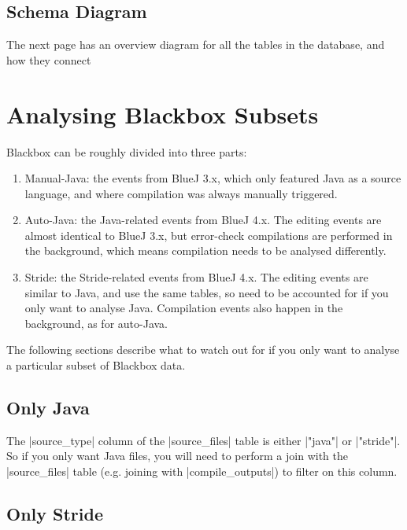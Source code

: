 \documentclass{report}
\begin{document}
\section{Schema Diagram}

The next page has an overview diagram for all the tables in the database, and
how they connect

\newpage



\chapter{Analysing Blackbox Subsets}
\label{sec:java-stride}

Blackbox can be roughly divided into three parts:
\begin{enumerate}
\item Manual-Java: the events from BlueJ 3.x, which only featured Java as a source language, and where compilation was always manually triggered.
\item Auto-Java: the Java-related events from BlueJ 4.x.  The editing events are almost identical to BlueJ 3.x, but error-check compilations are performed in the background, which means compilation needs to be analysed differently.
\item Stride: the Stride-related events from BlueJ 4.x.  The editing events are similar to Java, and use the same tables, so need to be accounted for if you only want to analyse Java.  Compilation events also happen in the background, as for auto-Java.
\end{enumerate}

The following sections describe what to watch out for if you only want to analyse a particular subset of Blackbox data.

\section{Only Java}

The |source_type| column of the |source_files| table is either |"java"| or |"stride"|.  So if you only want Java files, you will need to perform a join with the |source_files| table (e.g. joining with |compile_outputs|) to filter on this column.

\section{Only Stride}
\end{document}
